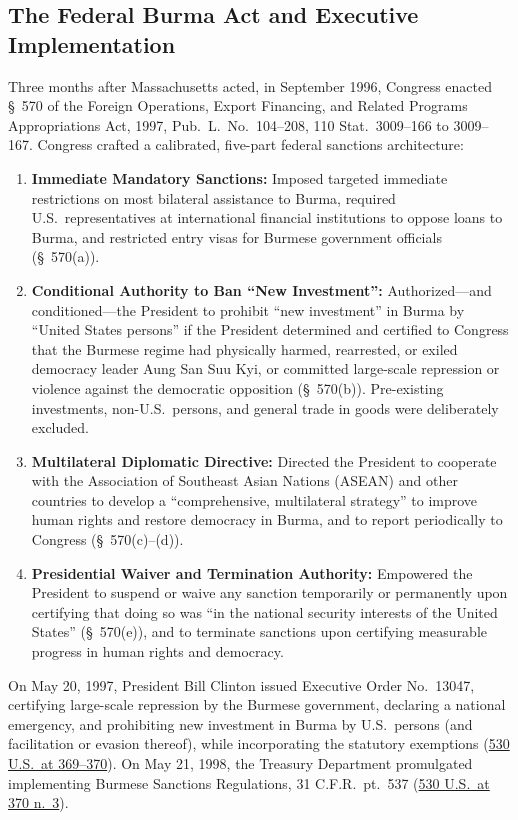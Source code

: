 \documentclass[12pt]{article}
\begin{document}
\subsection{The Federal Burma Act and Executive Implementation}
Three months after Massachusetts acted, in September 1996, Congress enacted \S~570 of the Foreign Operations, Export Financing, and Related Programs Appropriations Act, 1997, Pub.\ L.\ No.\ 104--208, 110 Stat.\ 3009--166 to 3009--167. Congress crafted a calibrated, five-part federal sanctions architecture:
\begin{enumerate}
    \item \textbf{Immediate Mandatory Sanctions:} Imposed targeted immediate restrictions on most bilateral assistance to Burma, required U.S.\ representatives at international financial institutions to oppose loans to Burma, and restricted entry visas for Burmese government officials (\S~570(a)).
    \item \textbf{Conditional Authority to Ban ``New Investment'':} Authorized---and conditioned---the President to prohibit ``new investment'' in Burma by ``United States persons'' if the President determined and certified to Congress that the Burmese regime had physically harmed, rearrested, or exiled democracy leader Aung San Suu Kyi, or committed large-scale repression or violence against the democratic opposition (\S~570(b)). Pre-existing investments, non-U.S.\ persons, and general trade in goods were deliberately excluded.
    \item \textbf{Multilateral Diplomatic Directive:} Directed the President to cooperate with the Association of Southeast Asian Nations (ASEAN) and other countries to develop a ``comprehensive, multilateral strategy'' to improve human rights and restore democracy in Burma, and to report periodically to Congress (\S~570(c)--(d)).
    \item \textbf{Presidential Waiver and Termination Authority:} Empowered the President to suspend or waive any sanction temporarily or permanently upon certifying that doing so was ``in the national security interests of the United States'' (\S~570(e)), and to terminate sanctions upon certifying measurable progress in human rights and democracy.
\end{enumerate}

On May 20, 1997, President Bill Clinton issued Executive Order No.\ 13047, certifying large-scale repression by the Burmese government, declaring a national emergency, and prohibiting new investment in Burma by U.S.\ persons (and facilitation or evasion thereof), while incorporating the statutory exemptions (\href{https://supreme.justia.com/cases/federal/us/530/363/}{530 U.S.\ at 369--370}). On May 21, 1998, the Treasury Department promulgated implementing Burmese Sanctions Regulations, 31 C.F.R.\ pt.\ 537 (\href{https://supreme.justia.com/cases/federal/us/530/363/}{530 U.S.\ at 370 n.\ 3}).
\end{document}
